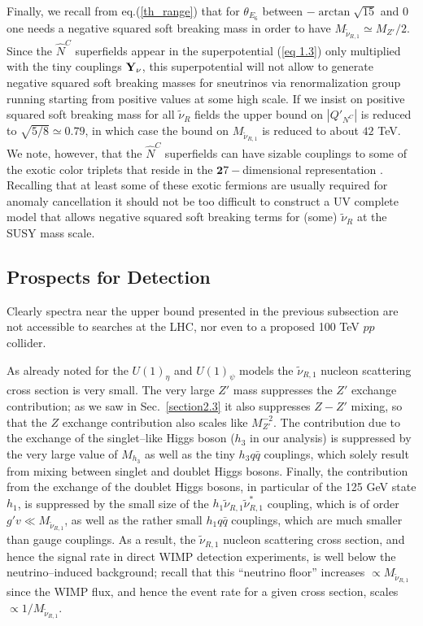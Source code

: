 \documentclass[a4paper,11pt]{article}
\begin{document}
Finally, we recall from eq.(\ref{th_range}) that for $\theta_{E_6}$
between $-\arctan\sqrt{15}$ and $0$ one needs a negative squared soft
breaking mass in order to have $M_{\tilde \nu_{R,1}} \simeq M_{Z'}/2$.
Since the $\hat N^C$ superfields appear in the superpotential (\ref{eq
  1.3}) only multiplied with the tiny couplings ${\bf Y_\nu}$, this
superpotential will not allow to generate negative squared soft
breaking masses for sneutrinos via renormalization group running
starting from positive values at some high scale. If we insist on
positive squared soft breaking mass for all $\tilde \nu_R$ fields the
upper bound on $|Q'_{N^C}|$ is reduced to $\sqrt{5/8} \simeq 0.79$, in
which case the bound on $M_{\tilde \nu_{R,1}}$ is reduced to about
$42$ TeV. We note, however, that the $\hat N^C$ superfields can have
sizable couplings to some of the exotic color triplets that reside in
the ${\mathbf 27}-$dimensional representation
\cite{Hewett:1988xc}. Recalling that at least some of these exotic
fermions are usually required for anomaly cancellation it should not
be too difficult to construct a UV complete model that allows negative
squared soft breaking terms for (some) $\tilde \nu_R$ at the SUSY mass
scale.

\subsection{Prospects for Detection}
\label{section4.5}

Clearly spectra near the upper bound presented in the previous subsection
are not accessible to searches at the LHC, nor even to a proposed 100 TeV
$pp$ collider.

As already noted for the $U(1)_\eta$ and $U(1)_\psi$ models the
$\tilde \nu_{R,1}$ nucleon scattering cross section is very small. The
very large $Z'$ mass suppresses the $Z'$ exchange contribution; as we saw
in Sec.~\ref{section2.3} it also suppresses $Z-Z'$ mixing, so that the
$Z$ exchange contribution also scales like $M_{Z'}^{-2}$. The
contribution due to the exchange of the singlet--like Higgs boson
($h_3$ in our analysis) is suppressed by the very large value of
$M_{h_3}$ as well as the tiny $h_3 q \bar q$ couplings, which solely
result from mixing between singlet and doublet Higgs bosons. Finally,
the contribution from the exchange of the doublet Higgs bosons, in
particular of the 125 GeV state $h_1$, is suppressed by the small size
of the $h_1 \tilde \nu_{R,1} \tilde \nu_{R,1}^*$ coupling, which is of
order $g' v \ll M_{\tilde \nu_{R,1}}$, as well as the rather small
$h_1 q \bar q$ couplings, which are much smaller than gauge
couplings. As a result, the $\tilde \nu_{R,1}$ nucleon scattering
cross section, and hence the signal rate in direct WIMP detection
experiments, is well below the neutrino--induced background; recall
that this ``neutrino floor'' increases $\propto M_{\tilde \nu_{R,1}}$
since the WIMP flux, and hence the event rate for a given cross
section, scales $\propto 1/M_{\tilde \nu_{R,1}}$.
\end{document}
